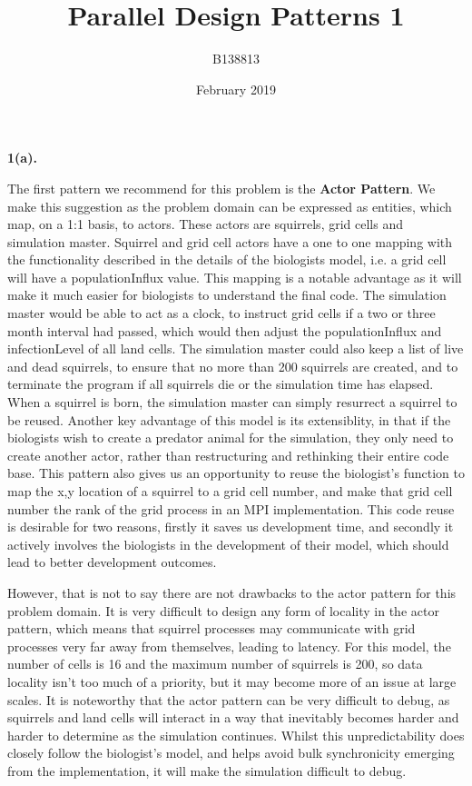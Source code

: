 \documentclass{article}
\title{Parallel Design Patterns 1}
\author{B138813}
\date{February 2019}
\begin{document}
\noindent\textbf{1(a).} \newline

The first pattern we recommend for this problem is the \textbf{Actor Pattern}. We make this suggestion as the problem domain can be expressed as entities, which map, on a 1:1 basis, to actors. These actors are squirrels, grid cells and simulation master. Squirrel and grid cell actors have a one to one mapping with the functionality described in the details of the biologists model, i.e. a grid cell will have a populationInflux value. This mapping is a notable advantage as it will make it much easier for biologists to understand the final code. The simulation master would be able to act as a clock, to instruct grid cells if a two or three month interval had passed, which would then adjust the populationInflux and infectionLevel of all land cells. The simulation master could also keep a list of live and dead squirrels, to ensure that no more than 200 squirrels are created, and to terminate the program if all squirrels die or the simulation time has elapsed. When a squirrel is born, the simulation master can simply resurrect a squirrel to be reused. Another key advantage of this model is its extensiblity, in that if the biologists wish to create a predator animal for the simulation, they only need to create another actor, rather than restructuring and rethinking their entire code base. This pattern also gives us an opportunity to reuse the biologist's function to map the x,y location of a squirrel to a grid cell number, and make that grid cell number the rank of the grid process in an MPI implementation. This code reuse is desirable for two reasons, firstly it saves us development time, and secondly it actively involves the biologists in the development of their model, which should lead to better development outcomes.

However, that is not to say there are not drawbacks to the actor pattern for this problem domain. It is very difficult to design any form of locality in the actor pattern, which means that squirrel processes may communicate with grid processes very far away from themselves, leading to latency. For this model, the number of cells is 16 and the maximum number of squirrels is 200, so data locality isn't too much of a priority, but it may become more of an issue at large scales. It is noteworthy that the actor pattern can be very difficult to debug, as squirrels and land cells will interact in a way that inevitably becomes harder and harder to determine as the simulation continues. Whilst this unpredictability does closely follow the biologist's model, and helps avoid bulk synchronicity emerging from  the implementation, it will make the simulation difficult to debug.
\end{document}
